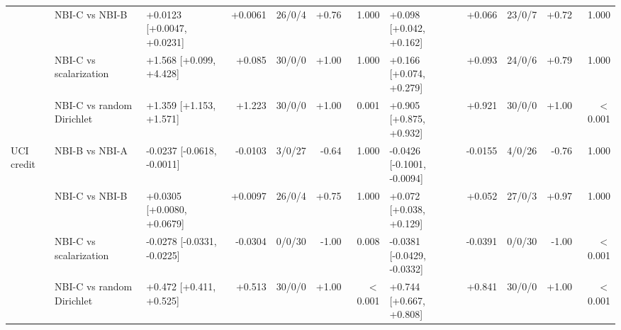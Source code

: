 \begin{table}[t]
{\begin{tabular}{ll lrlrr lrlrr}
 & NBI-C vs NBI-B & +0.0123 [+0.0047, +0.0231] & +0.0061 & 26/0/4 & +0.76 & 1.000 & +0.098 [+0.042, +0.162] & +0.066 & 23/0/7 & +0.72 & 1.000 \\
 & NBI-C vs scalarization & +1.568 [+0.099, +4.428] & +0.085 & 30/0/0 & +1.00 & 1.000 & +0.166 [+0.074, +0.279] & +0.093 & 24/0/6 & +0.79 & 1.000 \\
 & NBI-C vs random Dirichlet & +1.359 [+1.153, +1.571] & +1.223 & 30/0/0 & +1.00 & 0.001 & +0.905 [+0.875, +0.932] & +0.921 & 30/0/0 & +1.00 & $<$0.001 \\
\addlinespace
UCI credit & NBI-B vs NBI-A & -0.0237 [-0.0618, -0.0011] & -0.0103 & 3/0/27 & -0.64 & 1.000 & -0.0426 [-0.1001, -0.0094] & -0.0155 & 4/0/26 & -0.76 & 1.000 \\
 & NBI-C vs NBI-B & +0.0305 [+0.0080, +0.0679] & +0.0097 & 26/0/4 & +0.75 & 1.000 & +0.072 [+0.038, +0.129] & +0.052 & 27/0/3 & +0.97 & 1.000 \\
 & NBI-C vs scalarization & -0.0278 [-0.0331, -0.0225] & -0.0304 & 0/0/30 & -1.00 & 0.008 & -0.0381 [-0.0429, -0.0332] & -0.0391 & 0/0/30 & -1.00 & $<$0.001 \\
 & NBI-C vs random Dirichlet & +0.472 [+0.411, +0.525] & +0.513 & 30/0/0 & +1.00 & $<$0.001 & +0.744 [+0.667, +0.808] & +0.841 & 30/0/0 & +1.00 & $<$0.001 \\
\bottomrule
\end{tabular}}
\end{table}
